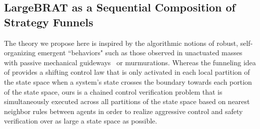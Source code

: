 \subsection{LargeBRAT as a Sequential Composition of Strategy Funnels}
% 
\label{sucsec:murmur_funnels}

The theory we propose here is inspired by the algorithmic notions of robust, self-organizing emergent ``behaviors" such as those observed in   unactuated masses with passive mechanical guideways~\cite{SeqCompKoditschek} or murmurations. Whereas the funneling idea of \cite{SeqCompKoditschek} provides a shifting control law that is only activated in each local partition of the state space when a system's state crosses the boundary towards each portion of the state space, ours is a chained control verification problem that is simultaneously executed across all partitions of the state space based on nearest neighbor rules between agents in order to realize aggressive control and safety verification over as large a state space as possible.

